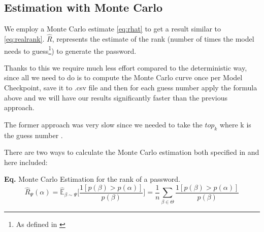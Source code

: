 \documentclass[english,noexaminfo,a4paper,oneside, binding = 0.6cm]{sapthesis}
\begin{document}
%
%

\subsection{Estimation with Monte Carlo}
We employ a Monte Carlo estimate \eqref{eq:rhat} to get a result similar to  \eqref{eq:realrank}.
$\hat{R}$, represents the estimate of the rank (number of times the model needs to guess\footnote{As defined in \cite{ref:dellamico}}) to generate the password.

Thanks to this we require much less effort compared to the deterministic way, since all we need to do is to compute the Monte Carlo curve  once per Model Checkpoint, save it to .csv file and then for each guess number apply the formula above and we will have our results significantly faster than the previous approach.

The former approach was very slow since we needed to take the $top_k$ where k is the guess number \cite{ref:maya}.

There are two ways to calculate the Monte Carlo estimation both specified in \cite{ref:dellamico} and here included:

\textbf{Eq.} Monte Carlo Estimation for the rank of a password.
\begin{equation}
\label{eq:rhat}
   \hat{R}_\Psi(\alpha) = \hat{\mathbb{E}}_{\beta\sim \Psi}\Bigg[\frac{  1[p(\beta) > p(\alpha)]}{p(\beta)}\Bigg] = \frac{1}{n}\sum_{\beta \in \Theta }\frac{1[p(\beta) > p(\alpha)]}{p(\beta)}
\end{equation}
\end{document}
